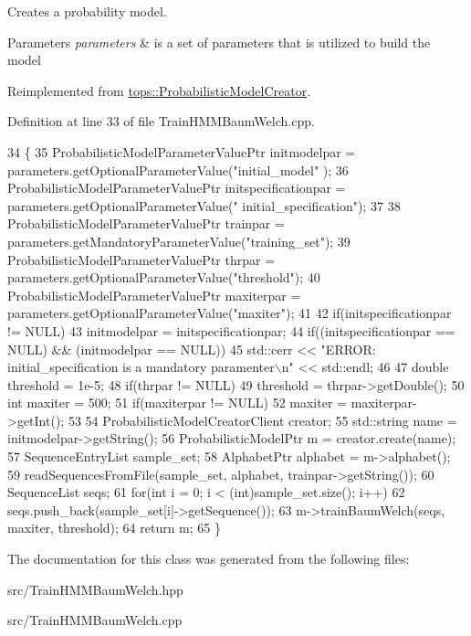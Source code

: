 Creates a probability model. 


\begin{DoxyParams}{Parameters}
{\em parameters} & is a set of parameters that is utilized to build the model \\
\hline
\end{DoxyParams}


Reimplemented from \hyperlink{classtops_1_1ProbabilisticModelCreator_afed6c8ffa45fff446bdaa8b533da8f7c}{tops\+::\+Probabilistic\+Model\+Creator}.



Definition at line 33 of file Train\+H\+M\+M\+Baum\+Welch.\+cpp.


\begin{DoxyCode}
34   \{
35     ProbabilisticModelParameterValuePtr initmodelpar = parameters.getOptionalParameterValue(\textcolor{stringliteral}{"initial\_model"}
      );
36     ProbabilisticModelParameterValuePtr initspecificationpar = parameters.getOptionalParameterValue(\textcolor{stringliteral}{"
      initial\_specification"});
37 
38     ProbabilisticModelParameterValuePtr trainpar = parameters.getMandatoryParameterValue(\textcolor{stringliteral}{"training\_set"});
39     ProbabilisticModelParameterValuePtr thrpar = parameters.getOptionalParameterValue(\textcolor{stringliteral}{"threshold"});
40     ProbabilisticModelParameterValuePtr maxiterpar = parameters.getOptionalParameterValue(\textcolor{stringliteral}{"maxiter"});
41 
42     \textcolor{keywordflow}{if}(initspecificationpar != NULL) 
43         initmodelpar = initspecificationpar;
44     \textcolor{keywordflow}{if}((initspecificationpar == NULL) && (initmodelpar == NULL)) 
45         std::cerr << \textcolor{stringliteral}{"ERROR: initial\_specification is a mandatory paramenter\(\backslash\)n"} << std::endl;
46 
47     \textcolor{keywordtype}{double} threshold = 1e-5;
48     \textcolor{keywordflow}{if}(thrpar != NULL)
49       threshold = thrpar->getDouble();
50     \textcolor{keywordtype}{int} maxiter = 500;
51     \textcolor{keywordflow}{if}(maxiterpar != NULL)
52       maxiter = maxiterpar->getInt();
53 
54     ProbabilisticModelCreatorClient creator;
55     std::string name = initmodelpar->getString();
56     ProbabilisticModelPtr m = creator.create(name);
57     SequenceEntryList sample\_set;
58     AlphabetPtr alphabet = m->alphabet();
59     readSequencesFromFile(sample\_set, alphabet, trainpar->getString());
60     SequenceList seqs;
61     \textcolor{keywordflow}{for}(\textcolor{keywordtype}{int} i = 0; i < (int)sample\_set.size(); i++)
62       seqs.push\_back(sample\_set[i]->getSequence());
63     m->trainBaumWelch(seqs, maxiter, threshold);
64     \textcolor{keywordflow}{return} m;
65   \}
\end{DoxyCode}


The documentation for this class was generated from the following files\+:\begin{DoxyCompactItemize}
\item 
src/Train\+H\+M\+M\+Baum\+Welch.\+hpp\item 
src/Train\+H\+M\+M\+Baum\+Welch.\+cpp\end{DoxyCompactItemize}

